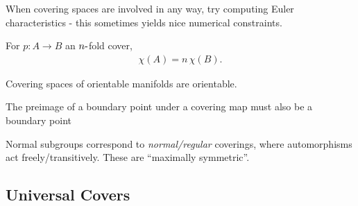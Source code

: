 \begin{remark}

When covering spaces are involved in any way, try computing Euler
characteristics - this sometimes yields nice numerical constraints.

\end{remark}

\begin{fact}

For \(p: A \xrightarrow{} B\) an \(n{\hbox{-}}\)fold cover,
\begin{align*}
\chi(A) = n\, \chi(B)
.\end{align*}

\end{fact}

\begin{fact}

Covering spaces of orientable manifolds are orientable.

\end{fact}

\begin{fact}

The preimage of a boundary point under a covering map must also be a
boundary point

\end{fact}

\begin{fact}

Normal subgroups correspond to \emph{normal/regular} coverings, where
automorphisms act freely/transitively. These are ``maximally
symmetric''.

\end{fact}

\hypertarget{universal-covers}{%
\subsection{Universal Covers}\label{universal-covers}}

